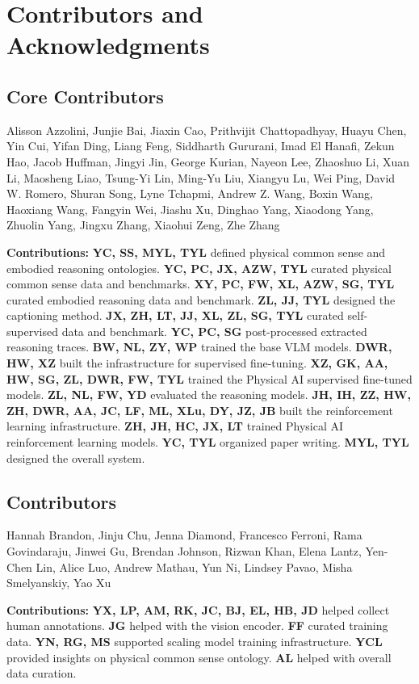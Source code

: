 \section{Contributors and Acknowledgments}
\label{sec::contributors}

\subsection{Core Contributors}
Alisson Azzolini, 
Junjie Bai,
Jiaxin Cao,
Prithvijit Chattopadhyay,
Huayu Chen, 
Yin Cui, 
Yifan Ding,
Liang Feng, 
Siddharth Gururani, 
Imad El Hanafi, 
Zekun Hao, 
Jacob Huffman, 
Jingyi Jin, 
George Kurian, 
Nayeon Lee, 
Zhaoshuo Li, 
Xuan Li, 
Maosheng Liao, 
Tsung-Yi Lin, 
Ming-Yu Liu, 
Xiangyu Lu, 
Wei Ping, 
David W. Romero,
Shuran Song, 
Lyne Tchapmi, 
Andrew Z. Wang, 
Boxin Wang, 
Haoxiang Wang, 
Fangyin Wei, 
Jiashu Xu, 
Dinghao Yang,
Xiaodong Yang, 
Zhuolin Yang, 
Jingxu Zhang, 
Xiaohui Zeng, 
Zhe Zhang


\noindent \textbf{Contributions:} 
\textbf{YC, SS, MYL, TYL} defined physical common sense and embodied reasoning ontologies. \textbf{YC, PC, JX, AZW, TYL} curated physical common sense data and benchmarks. \textbf{XY, PC, FW, XL, AZW, SG, TYL} curated embodied reasoning data and benchmark. \textbf{ZL, JJ, TYL} designed the captioning method. \textbf{JX, ZH, LT, JJ, XL, ZL, SG, TYL} curated self-supervised data and benchmark. \textbf{YC, PC, SG} post-processed extracted reasoning traces. \textbf{BW, NL, ZY, WP} trained the base VLM models. \textbf{DWR, HW, XZ} built the infrastructure for supervised fine-tuning. \textbf{XZ, GK, AA, HW, SG, ZL, DWR, FW, TYL} trained the Physical AI supervised fine-tuned models. \textbf{ZL, NL, FW, YD} evaluated the reasoning models. \textbf{JH, IH, ZZ, HW, ZH, DWR, AA, JC, LF, ML, XLu, DY, JZ, JB} built the reinforcement learning infrastructure. \textbf{ZH, JH, HC, JX, LT}  trained Physical AI reinforcement learning models.  \textbf{YC, TYL} organized paper writing. \textbf{MYL, TYL} designed the overall system.

\subsection{Contributors}
Hannah Brandon,
Jinju Chu,
Jenna Diamond,
Francesco Ferroni,
Rama Govindaraju,
Jinwei Gu,
Brendan Johnson,
Rizwan Khan,
Elena Lantz,
Yen-Chen Lin,
Alice Luo,
Andrew Mathau,
Yun Ni,
Lindsey Pavao,
Misha Smelyanskiy,
Yao Xu

\textbf{Contributions:}
\textbf{YX, LP, AM, RK, JC, BJ, EL, HB, JD} helped collect human annotations. \textbf{JG} helped with the vision encoder. \textbf{FF} curated training data. \textbf{YN, RG, MS} supported scaling model training infrastructure. \textbf{YCL} provided insights on physical common sense ontology. \textbf{AL} helped with overall data curation.


